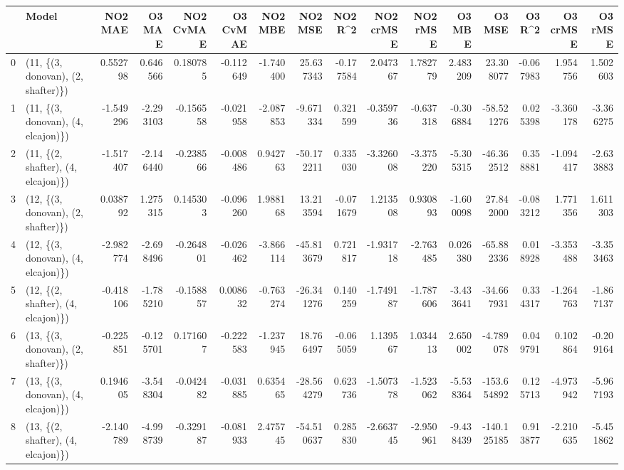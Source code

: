 \begin{tabular}{llrrrrrrrrrrrrrr}
\toprule
{} &                               Model &   NO2 MAE &     O3 MAE &  NO2 CvMAE &  O3 CvMAE &    NO2 MBE &     NO2 MSE &   NO2 R\textasciicircum2 &  NO2 crMSE &  NO2 rMSE &     O3 MBE &      O3 MSE &    O3 R\textasciicircum2 &  O3 crMSE &    O3 rMSE \\
\midrule
0  &  (11, \{(3, donovan), (2, shafter)\}) &  0.552798 &   0.646566 &   0.180785 & -0.112649 &  -1.740400 &   25.637343 & -0.177584 &   2.047367 &  1.782779 &   2.483209 &   23.308077 & -0.067983 &  1.954756 &   1.502603 \\
1  &  (11, \{(3, donovan), (4, elcajon)\}) & -1.549296 &  -2.293103 &  -0.156558 & -0.021958 &  -2.087853 &   -9.671334 &  0.321599 &  -0.359736 & -0.637318 &  -0.306884 &  -58.521276 &  0.025398 & -3.360178 &  -3.366275 \\
2  &  (11, \{(2, shafter), (4, elcajon)\}) & -1.517407 &  -2.146440 &  -0.238566 & -0.008486 &   0.942763 &  -50.172211 &  0.335030 &  -3.326008 & -3.375220 &  -5.305315 &  -46.362512 &  0.358881 & -1.094417 &  -2.633883 \\
3  &  (12, \{(3, donovan), (2, shafter)\}) &  0.038792 &   1.275315 &   0.145303 & -0.096260 &   1.988168 &   13.213594 & -0.071679 &   1.213508 &  0.930893 &  -1.600098 &   27.842000 & -0.083212 &  1.771356 &   1.611303 \\
4  &  (12, \{(3, donovan), (4, elcajon)\}) & -2.982774 &  -2.698496 &  -0.264801 & -0.026462 &  -3.866114 &  -45.813679 &  0.721817 &  -1.931718 & -2.763485 &   0.026380 &  -65.882336 &  0.018928 & -3.353488 &  -3.353463 \\
5  &  (12, \{(2, shafter), (4, elcajon)\}) & -0.418106 &  -1.785210 &  -0.158857 &  0.008632 &  -0.763274 &  -26.341276 &  0.140259 &  -1.749187 & -1.787606 &  -3.433641 &  -34.667931 &  0.334317 & -1.264763 &  -1.867137 \\
6  &  (13, \{(3, donovan), (2, shafter)\}) & -0.225851 &  -0.125701 &   0.171607 & -0.222583 &  -1.237945 &   18.766497 & -0.065059 &   1.139567 &  1.034413 &   2.650002 &   -4.789078 &  0.049791 &  0.102864 &  -0.209164 \\
7  &  (13, \{(3, donovan), (4, elcajon)\}) &  0.194605 &  -3.548304 &  -0.042482 & -0.031885 &   0.635465 &  -28.564279 &  0.623736 &  -1.507378 & -1.523062 &  -5.538364 & -153.654892 &  0.125713 & -4.973942 &  -5.967193 \\
8  &  (13, \{(2, shafter), (4, elcajon)\}) & -2.140789 &  -4.998739 &  -0.329187 & -0.081933 &   2.475745 &  -54.510637 &  0.285830 &  -2.663745 & -2.950961 &  -9.438439 & -140.125185 &  0.913877 & -2.210635 &  -5.451862 \\

\end{tabular}
